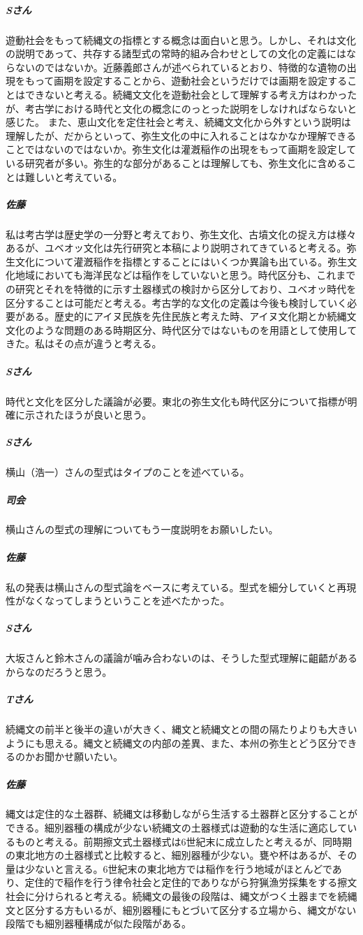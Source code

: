 \documentclass[a4j,11pt,twocolumn,openany]{jsbook}
\begin{document}
\subparagraph{Sさん}遊動社会をもって続縄文の指標とする概念は面白いと思う。しかし、それは文化の説明であって、共存する諸型式の常時的組み合わせとしての文化の定義にはならないのではないか。近藤義郎さんが述べられているとおり、特徴的な遺物の出現をもって画期を設定することから、遊動社会というだけでは画期を設定することはできないと考える。続縄文文化を遊動社会として理解する考え方はわかったが、考古学における時代と文化の概念にのっとった説明をしなければならないと感じた。
また、恵山文化を定住社会と考え、続縄文文化から外すという説明は理解したが、だからといって、弥生文化の中に入れることはなかなか理解できることではないのではないか。弥生文化は灌漑稲作の出現をもって画期を設定している研究者が多い。弥生的な部分があることは理解しても、弥生文化に含めることは難しいと考えている。
\subparagraph{佐藤}私は考古学は歴史学の一分野と考えており、弥生文化、古墳文化の捉え方は様々あるが、ユベオッ文化は先行研究と本稿により説明されてきていると考える。弥生文化について灌漑稲作を指標とすることにはいくつか異論も出ている。弥生文化地域においても海洋民などは稲作をしていないと思う。時代区分も、これまでの研究とそれを特徴的に示す土器様式の検討から区分しており、ユベオッ時代を区分することは可能だと考える。考古学的な文化の定義は今後も検討していく必要がある。歴史的にアイヌ民族を先住民族と考えた時、アイヌ文化期とか続縄文文化のような問題のある時期区分、時代区分ではないものを用語として使用してきた。私はその点が違うと考える。
\subparagraph{Sさん}時代と文化を区分した議論が必要。東北の弥生文化も時代区分について指標が明確に示されたほうが良いと思う。
\subparagraph{Sさん}横山（浩一）さんの型式はタイプのことを述べている。
\subparagraph{司会}横山さんの型式の理解についてもう一度説明をお願いしたい。
\subparagraph{佐藤}私の発表は横山さんの型式論をベースに考えている。型式を細分していくと再現性がなくなってしまうということを述べたかった。
\subparagraph{Sさん}大坂さんと鈴木さんの議論が噛み合わないのは、そうした型式理解に齟齬があるからなのだろうと思う。
\subparagraph{Tさん}続縄文の前半と後半の違いが大きく、縄文と続縄文との間の隔たりよりも大きいようにも思える。縄文と続縄文の内部の差異、また、本州の弥生とどう区分できるのかお聞かせ願いたい。
\subparagraph{佐藤}縄文は定住的な土器群、続縄文は移動しながら生活する土器群と区分することができる。細別器種の構成が少ない続縄文の土器様式は遊動的な生活に適応しているものと考える。前期擦文式土器様式は6世紀末に成立したと考えるが、同時期の東北地方の土器様式と比較すると、細別器種が少ない。甕や杯はあるが、その量は少ないと言える。6世紀末の東北地方では稲作を行う地域がほとんどであり、定住的で稲作を行う律令社会と定住的でありながら狩猟漁労採集をする擦文社会に分けられると考える。続縄文の最後の段階は、縄文がつく土器までを続縄文と区分する方もいるが、細別器種にもとづいて区分する立場から、縄文がない段階でも細別器種構成が似た段階がある。
\end{document}
